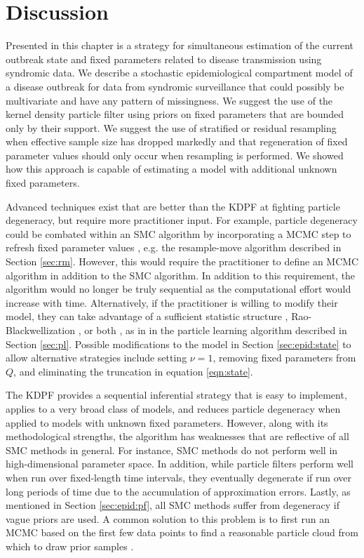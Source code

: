 \section{Discussion \label{sec:discussion}}

Presented in this chapter is a strategy for simultaneous estimation of the current outbreak state and fixed parameters related to disease transmission using syndromic data. We describe a stochastic epidemiological compartment model of a disease outbreak for data from syndromic surveillance that could possibly be multivariate and have any pattern of missingness. We suggest the use of the kernel density particle filter \citep{Liu:West:comb:2001} using priors on fixed parameters that are bounded only by their support. We suggest the use of stratified or residual resampling when effective sample size has dropped markedly and that regeneration of fixed parameter values should only occur when resampling is performed. We showed how this approach is capable of estimating a model with additional unknown fixed parameters.

Advanced techniques exist that are better than the KDPF at fighting particle degeneracy, but require more practitioner input. For example, particle degeneracy could be combated within an SMC algorithm by incorporating a MCMC step to refresh fixed parameter values \citep{Gilk:Berz:foll:2001,Stor:part:2002}, e.g. the resample-move algorithm described in Section \ref{sec:rm}. However, this would require the practitioner to define an MCMC algorithm in addition to the SMC algorithm. In addition to this requirement, the algorithm would no longer be truly sequential as the computational effort would increase with time. Alternatively, if the practitioner is willing to modify their model, they can take advantage of a sufficient statistic structure \citep{Fear:mark:2002}, Rao-Blackwellization \citep{Douc:Gods:Andr:on:2000}, or both \citep{Carv:Joha:Lope:Pols:part}, as in in the particle learning algorithm described in Section \ref{sec:pl}. Possible modifications to the model in Section \ref{sec:epid:state} to allow alternative strategies include setting $\nu=1$, removing fixed parameters from $Q$, and eliminating the truncation in equation \eqref{eqn:state}.

The KDPF provides a sequential inferential strategy that is easy to implement, applies to a very broad class of models, and reduces particle degeneracy when applied to models with unknown fixed parameters. However, along with its methodological strengths, the algorithm has weaknesses that are reflective of all SMC methods in general. For instance, SMC methods do not perform well in high-dimensional parameter space. In addition, while particle filters perform well when run over fixed-length time intervals, they eventually degenerate if run over long periods of time due to the accumulation of approximation errors. Lastly, as mentioned in Section \ref{sec:epid:pf}, all SMC methods suffer from degeneracy if vague priors are used. A common solution to this problem is to first run an MCMC based on the first few data points to find a reasonable particle cloud from which to draw prior samples \cite[Chap 5,][]{petris:camp:2009:dynamic}.

